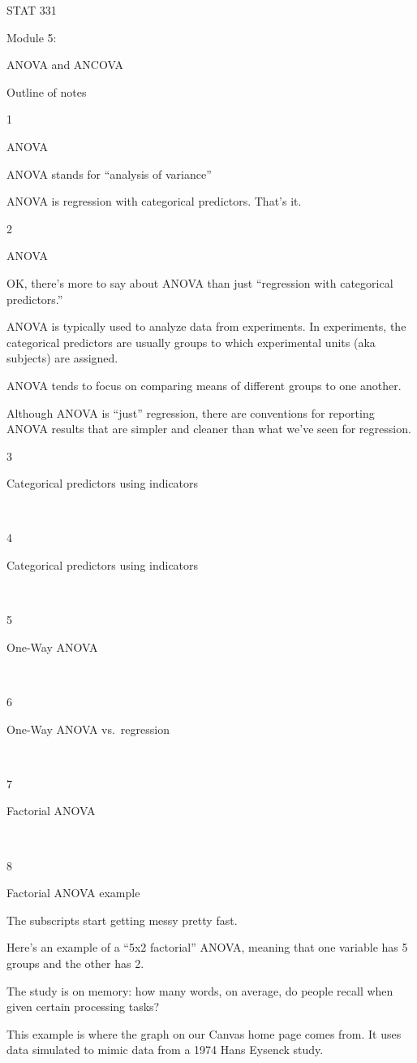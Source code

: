 \documentclass[
  letterpaper,
  DIV=11,
  numbers=noendperiod]{scrreprt}
\begin{document}
STAT 331

Module 5:

ANOVA and ANCOVA

Outline of notes

1

ANOVA

ANOVA stands for ``analysis of variance''

ANOVA is regression with categorical predictors. That's it.

2

ANOVA

OK, there's more to say about ANOVA than just ``regression with
categorical predictors.''

ANOVA is typically used to analyze data from experiments. In
experiments, the categorical predictors are usually groups to which
experimental units (aka subjects) are assigned.

ANOVA tends to focus on comparing means of different groups to one
another.

Although ANOVA is ``just'' regression, there are conventions for
reporting ANOVA results that are simpler and cleaner than what we've
seen for regression.

3

Categorical predictors using indicators

~

4

Categorical predictors using indicators

~

5

One-Way ANOVA

~

6

One-Way ANOVA vs.~regression

~

7

Factorial ANOVA

~

8

Factorial ANOVA example

The subscripts start getting messy pretty fast.

Here's an example of a ``5x2 factorial'' ANOVA, meaning that one
variable has 5 groups and the other has 2.

The study is on memory: how many words, on average, do people recall
when given certain processing tasks?

This example is where the graph on our Canvas home page comes from. It
uses data simulated to mimic data from a 1974 Hans Eysenck study.
\end{document}
